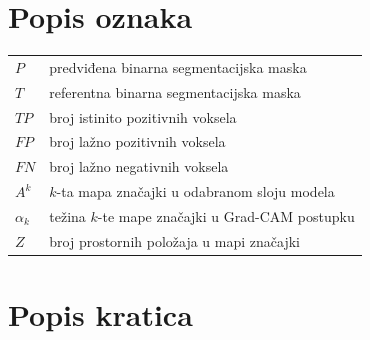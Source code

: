 \documentclass[a4paper,12pt,oneside]{article}
\let\sectionwithoutpagebreak\section
\renewcommand{\section}{\clearpage\sectionwithoutpagebreak}%
\begin{document}
\newpage
{}



\newpage
\section*{Popis oznaka}

\begin{tabular}{>{\raggedright\arraybackslash}p{} >{\raggedright\arraybackslash}p{}}
$P$ & predviđena binarna segmentacijska maska \\
$T$ & referentna binarna segmentacijska maska \\
$TP$ & broj istinito pozitivnih voksela \\
$FP$ & broj lažno pozitivnih voksela \\
$FN$ & broj lažno negativnih voksela \\
$A^k$ & $k$-ta mapa značajki u odabranom sloju modela \\
$\alpha_k$ & težina $k$-te mape značajki u Grad-CAM postupku \\
$Z$ & broj prostornih položaja u mapi značajki \\
\end{tabular}

\newpage
\section*{Popis kratica}
\end{document}

